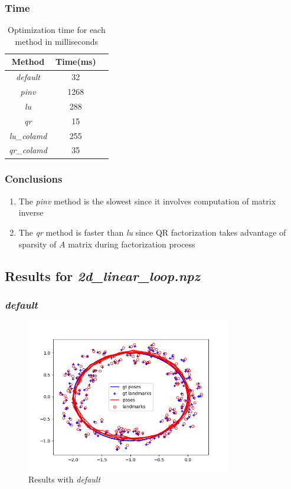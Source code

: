 \documentclass[12pt, a4paper]{article}
\begin{document}
\subsubsection{Time}
\begin{table}[H]
  \centering
  \begin{tabular}{|c|c|c|}
  \hline
  \textbf{Method} & \textbf{Time(ms)}\\
  \hline
  \textit{default} & 32\\\hline
  \textit{pinv} & 1268\\\hline
  \textit{lu} & 288\\\hline
  \textit{qr} & 15\\\hline
  \textit{lu\_colamd} & 255\\\hline
  \textit{qr\_colamd} & 35\\\hline
  \hline
  \end{tabular}
  \caption{Optimization time for each method in milliseconds}
  \end{table}
\subsubsection{Conclusions}
\begin{enumerate}
  \item The \textit{pinv} method is the slowest since it involves computation of matrix inverse
  \item The \textit{qr} method is faster than \textit{lu} since QR factorization takes advantage of sparsity of $A$ matrix during factorization process

\end{enumerate}
\subsection{Results for \textit{2d\_linear\_loop.npz}}
\subsubsection{\textit{default}}
\begin{figure}[H]
  \centering
  \includegraphics[width=0.8\textwidth]{./results/linear/default_2d_linear_loop_map.png}
  \caption{Results with \textit{default}}
\end{figure}
\end{document}
